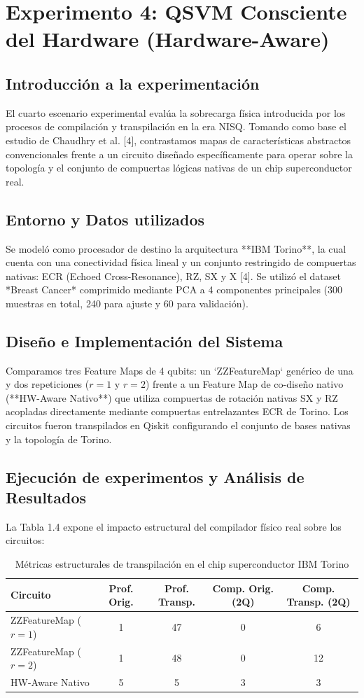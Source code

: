 \documentclass[12pt,oneside]{report}
\begin{document}
\section{Experimento 4: QSVM Consciente del Hardware (Hardware-Aware)}

\subsection{Introducción a la experimentación}
El cuarto escenario experimental evalúa la sobrecarga física introducida por los procesos de compilación y transpilación en la era NISQ. Tomando como base el estudio de Chaudhry et al. [4], contrastamos mapas de características abstractos convencionales frente a un circuito diseñado específicamente para operar sobre la topología y el conjunto de compuertas lógicas nativas de un chip superconductor real.

\subsection{Entorno y Datos utilizados}
Se modeló como procesador de destino la arquitectura **IBM Torino**, la cual cuenta con una conectividad física lineal y un conjunto restringido de compuertas nativas: ECR (Echoed Cross-Resonance), RZ, SX y X [4]. Se utilizó el dataset *Breast Cancer* comprimido mediante PCA a 4 componentes principales (300 muestras en total, 240 para ajuste y 60 para validación).

\subsection{Diseño e Implementación del Sistema}
Comparamos tres Feature Maps de 4 qubits: un `ZZFeatureMap` genérico de una y dos repeticiones ($r=1$ y $r=2$) frente a un Feature Map de co-diseño nativo (**HW-Aware Nativo**) que utiliza compuertas de rotación nativas SX y RZ acopladas directamente mediante compuertas entrelazantes ECR de Torino. Los circuitos fueron transpilados en Qiskit configurando el conjunto de bases nativas y la topología de Torino.

\subsection{Ejecución de experimentos y Análisis de Resultados}
La Tabla 1.4 expone el impacto estructural del compilador físico real sobre los circuitos:

\begin{table}[h]
\centering
\caption{Métricas estructurales de transpilación en el chip superconductor IBM Torino}
\label{tab:transpilacion}
\begin{tabular}{lcccc}
\toprule
\textbf{Circuito} & \textbf{Prof. Orig.} & \textbf{Prof. Transp.} & \textbf{Comp. Orig. (2Q)} & \textbf{Comp. Transp. (2Q)} \\
\midrule
ZZFeatureMap ($r = 1$) & 1 & 47 & 0 & 6 \\
ZZFeatureMap ($r = 2$) & 1 & 48 & 0 & 12 \\
HW-Aware Nativo & 5 & 5 & 3 & 3 \\
\bottomrule
\end{tabular}
\end{table}
\end{document}
